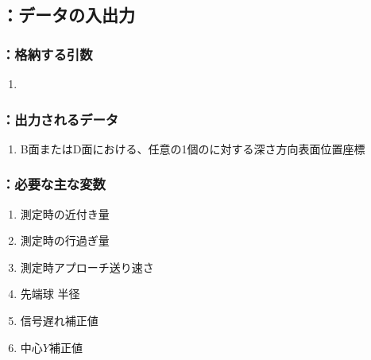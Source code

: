 \subsection{\DMLthreeBD：データの入出力}

\subsubsection{\DMLthreeBD：格納する引数}
\begin{enumerate}[label*=\sarrow]
\item \PMBDFaceSelectionFlag
\end{enumerate}

\subsubsection{\DMLthreeBD：出力されるデータ}
\begin{enumerate}[label*=\sarrow]
\item B面またはD面における、任意の1個の\Dimple に対する深さ方向表面位置座標
\end{enumerate}

\subsubsection{\DMLthreeBD：必要な主な変数}
\begin{enumerate}[label*=\sarrow]
\item \TouchSensorProbe 測定時の近付き量
\item \TouchSensorProbe 測定時の行過ぎ量
\item \TouchSensorProbe 測定時アプローチ送り速さ
\item \TouchSensorProbe 先端球 半径
\item \TouchSensorProbe 信号遅れ補正値
\item \TouchSensorProbe 中心$Y$補正値
\end{enumerate}


